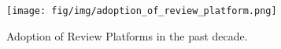 \begin{figure}
    \centering
    \texttt{[image: fig/img/adoption\_of\_review\_platform.png]}
    \caption{Adoption of Review Platforms in the past decade. }
    \label{fig:adoption_of_review_platforms}
\end{figure}